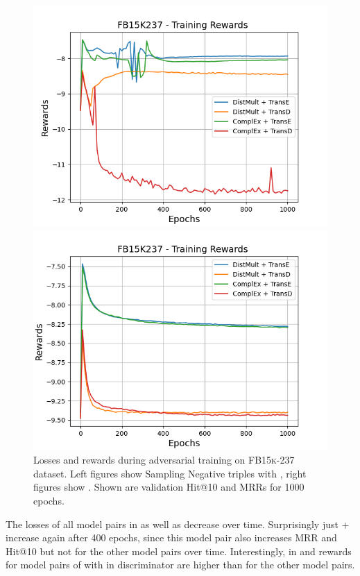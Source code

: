 \begin{figure}[H]
    \begin{minipage}{.5\textwidth}
      \centering
      \includegraphics[width=0.9\linewidth]{figures/results/gan_train/not_pretrained/uncertainty/max/entropy/fb15k237/1k_epochs/uncertainty_fb15k237_rew.png}
    \end{minipage}%
    \begin{minipage}{.5\textwidth}
      \centering
      \includegraphics[width=0.9\linewidth]{figures/results/gan_train/not_pretrained/uncertainty/max_distribution/entropy/fb15k237/1k_epochs/uncertainty_fb15k237_rew.png}
    \end{minipage}%
    \caption{Losses and rewards during adversarial training on \textsc{FB15k-237} dataset. 
    Left figures show Sampling Negative triples with \usmax, right figures show \ussoftmax.
    Shown are validation Hit@10 and MRRs for 1000 epochs.}
    \label{fig:advtrain_fb15k237_usmax_ussoftmax_losses_rewards}
\end{figure}
The losses of all model pairs in \usmax as well as \ussoftmax decrease over time.
Surprisingly just \complex + \transe increase again after 400 epochs, since this model pair also increases MRR and Hit@10 but not for the other model pairs over time.
Interestingly, in \usmax and \ussoftmax rewards for model pairs of with \transe in discriminator are higher than for the other model pairs.